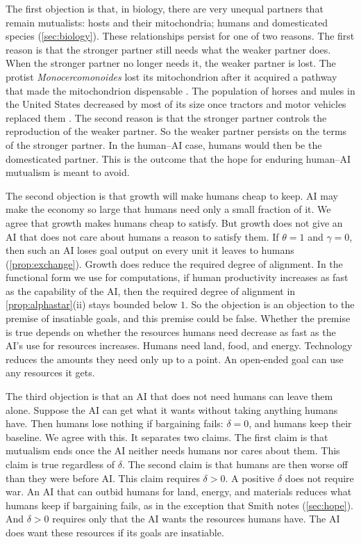 \documentclass[article, 11pt, reqno]{amsart}
\theoremstyle{named}
\theoremstyle{plain}
\begin{document}
The first objection is that, in biology, there are very unequal partners that remain mutualists: hosts and their mitochondria; humans and domesticated species (\cref{sec:biology}). These relationships persist for one of two reasons. The first reason is that the stronger partner still needs what the weaker partner does. When the stronger partner no longer needs it, the weaker partner is lost. The protist \emph{Monocercomonoides} lost its mitochondrion after it acquired a pathway that made the mitochondrion dispensable \citep{Karnkowska2016}. The population of horses and mules in the United States decreased by most of its size once tractors and motor vehicles replaced them \citep{Kilby2007}. The second reason is that the stronger partner controls the reproduction of the weaker partner. So the weaker partner persists on the terms of the stronger partner. In the human--AI case, humans would then be the domesticated partner. This is the outcome that the hope for enduring human--AI mutualism is meant to avoid.

The second objection is that growth will make humans cheap to keep. AI may make the economy so large that humans need only a small fraction of it. We agree that growth makes humans cheap to satisfy. But growth does not give an AI that does not care about humans a reason to satisfy them. If $\theta = 1$ and $\gamma = 0$, then such an AI loses goal output on every unit it leaves to humans (\cref{prop:exchange}). Growth does reduce the required degree of alignment. In the functional form we use for computations, if human productivity increases as fast as the capability of the AI, then the required degree of alignment in \cref{prop:alphastar}(ii) stays bounded below $1$. So the objection is an objection to the premise of insatiable goals, and this premise could be false. Whether the premise is true depends on whether the resources humans need decrease as fast as the AI's use for resources increases. Humans need land, food, and energy. Technology reduces the amounts they need only up to a point. An open-ended goal can use any resources it gets.

The third objection is that an AI that does not need humans can leave them alone. Suppose the AI can get what it wants without taking anything humans have. Then humans lose nothing if bargaining fails: $\delta = 0$, and humans keep their baseline. We agree with this. It separates two claims. The first claim is that mutualism ends once the AI neither needs humans nor cares about them. This claim is true regardless of $\delta$. The second claim is that humans are then worse off than they were before AI. This claim requires $\delta > 0$. A positive $\delta$ does not require war. An AI that can outbid humans for land, energy, and materials reduces what humans keep if bargaining fails, as in the exception that Smith notes (\cref{sec:hope}). And $\delta > 0$ requires only that the AI wants the resources humans have. The AI does want these resources if its goals are insatiable.
\end{document}

